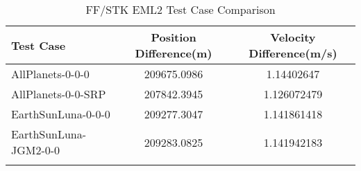 \begin{table}[htbp!]
\centering
\caption{ FF/STK EML2 Test Case Comparison}
      \begin{tabular}{lcc}
      \hline\hline
          Test Case & Position Difference(m) & Velocity Difference(m/s) \\
         \hline
         AllPlanets-0-0-0 & 209675.0986 & 1.14402647 \\
         AllPlanets-0-0-SRP & 207842.3945 & 1.126072479 \\
         EarthSunLuna-0-0-0 & 209277.3047 & 1.141861418 \\
         EarthSunLuna-JGM2-0-0 & 209283.0825 & 1.141942183 \\
      \hline\hline
      \label{Table: EML2 FF-STK Table} 
\end{tabular}
\end{table}
